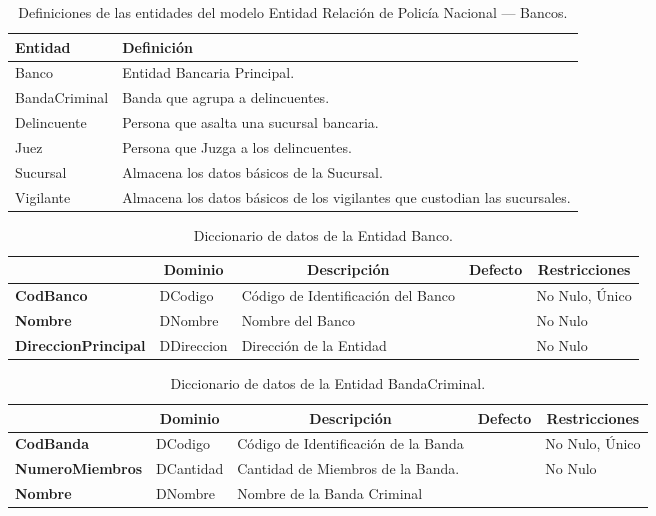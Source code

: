 \begin{table}[H]
\centering
\caption{Definiciones de las entidades del modelo Entidad Relación de Policía Nacional --- Bancos.}
\renewcommand{\arraystretch}{1.5}%
\label{tab-Dicc-20}
\begin{tabular}{@{}ll@{}}
\toprule
\textbf{Entidad}  & \textbf{Definición}\\ \midrule
Banco    & Entidad Bancaria Principal. \\
BandaCriminal  & Banda que agrupa a delincuentes.\\
Delincuente & Persona que asalta una sucursal bancaria.\\
Juez & Persona que Juzga a los delincuentes.\\
Sucursal & Almacena los datos básicos de la Sucursal.\\
Vigilante & Almacena los datos básicos de los vigilantes que custodian las sucursales.\\
\bottomrule
\end{tabular}
\end{table}

\begin{table}[H]
\centering
\caption{Diccionario de datos de la Entidad Banco.}
\label{tab-Dicc-21}
\begin{tabular}{>{\bfseries}m{4.0cm}>{}m{3.0cm}>{}m{6.0cm}>{}m{5.0cm}>{}m{2.0cm}}
\toprule
\multicolumn{1}{c}{\textbf{Atributo}} & \multicolumn{1}{c}{\textbf{Dominio}} & \multicolumn{1}{c}{\textbf{Descripción}} & \multicolumn{1}{c}{\textbf{Defecto}} & \multicolumn{1}{c}{\textbf{Restricciones}} \\ \midrule
CodBanco	        &	DCodigo	    &	Código de Identificación del Banco	&		&	No Nulo, Único\\
Nombre	            &	DNombre	    &	Nombre del Banco	                &		&	No Nulo\\
DireccionPrincipal	&	DDireccion	&	Dirección de la Entidad	            &		&	No Nulo\\
\bottomrule
\end{tabular}
\end{table}

\begin{table}[H]
\centering
\caption{Diccionario de datos de la Entidad BandaCriminal.}
\label{tab-Dicc-22}
\begin{tabular}{>{\bfseries}m{4.0cm}>{}m{3.0cm}>{}m{6.0cm}>{}m{5.0cm}>{}m{2.0cm}}
\toprule
\multicolumn{1}{c}{\textbf{Atributo}} & \multicolumn{1}{c}{\textbf{Dominio}} & \multicolumn{1}{c}{\textbf{Descripción}} & \multicolumn{1}{c}{\textbf{Defecto}} & \multicolumn{1}{c}{\textbf{Restricciones}} \\ \midrule
CodBanda	&	DCodigo	&	Código de Identificación de la Banda	&		&	No Nulo, Único\\
NumeroMiembros	&	DCantidad	&	Cantidad de Miembros de la Banda.	&		&	No Nulo\\
Nombre	&	DNombre	&	Nombre de la Banda Criminal	&		&	\\
\bottomrule
\end{tabular}
\end{table}

